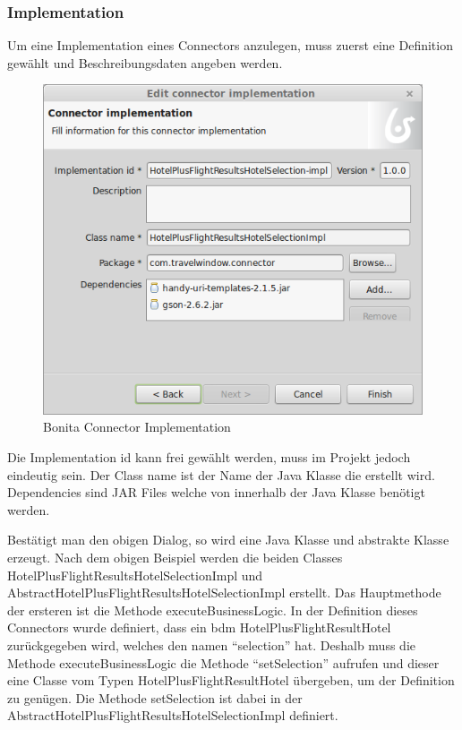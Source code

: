 \subsubsection{Implementation}
Um eine Implementation eines Connectors anzulegen, muss zuerst eine Definition gewählt und Beschreibungsdaten angeben werden.
\begin{figure}[H]
	\centering
	\includegraphics[width=1\textwidth]{images/bonita-connectors-implementation.png}
	\caption{Bonita Connector Implementation}
	\label{fig:analyse:bonita:connectors:implementation}
\end{figure}
Die Implementation id kann frei gewählt werden, muss im Projekt jedoch eindeutig sein. Der Class name ist der Name der Java Klasse die erstellt wird. Dependencies sind JAR Files welche von innerhalb der Java Klasse benötigt werden.

Bestätigt man den obigen Dialog, so wird eine Java Klasse und abstrakte Klasse erzeugt. Nach dem obigen Beispiel werden die beiden Classes HotelPlusFlightResultsHotelSelectionImpl und AbstractHotelPlusFlightResultsHotelSelectionImpl erstellt. Das Hauptmethode der ersteren ist die Methode executeBusinessLogic. In der Definition dieses Connectors wurde definiert, dass ein \gls{bdm} HotelPlusFlightResultHotel zurückgegeben wird, welches den namen "`selection"' hat. Deshalb muss die Methode executeBusinessLogic die Methode "`setSelection"' aufrufen und dieser eine Classe vom Typen HotelPlusFlightResultHotel übergeben, um der Definition zu genügen. 
Die Methode setSelection ist dabei in der AbstractHotelPlusFlightResultsHotelSelectionImpl definiert.

